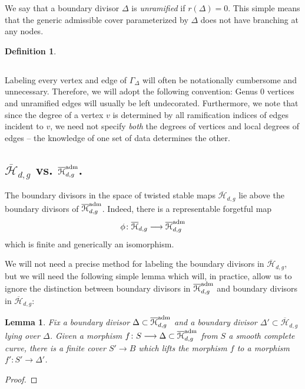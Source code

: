 \documentclass[reqno, 10 pt]{article}
\newtheorem{lem}[thm]{Lemma}
\theoremstyle{definition}
\newtheorem{defn}[thm]{Definition}
\theoremstyle{remark}
\numberwithin{equation}{section}
\numberwithin{thm}{section}
\numberwithin{prop}{section}
\numberwithin{lem}{section}
\numberwithin{cor}{section}
\numberwithin{conj}{section}
\numberwithin{defn}{section}
\renewcommand{\H}{\mathcal H}
\newcommand{\Hdg}{\overline{\H}_{d,g}}
\renewcommand{\to}{\longrightarrow}
\newcommand {\from}{{\colon}}
\renewcommand{\H}{{\mathcal{H}}}
\begin{document}
  We say that a boundary divisor $\Delta$ is {\sl unramified} if $r(\Delta)=0$.  This simple means that the generic admissible cover parameterized by $\Delta$ does not have branching at any nodes.

  \begin{defn}\label{excessdefn}

  \end{defn}


\subsection{}
  Labeling every vertex and edge of $\Gamma_{\Delta}$ will often be notationally cumbersome and unnecessary.  Therefore, we will adopt the following convention: Genus $0$ vertices and unramified edges will usually be left undecorated. Furthermore, we note that since the degree of a vertex $v$ is determined by all ramification indices of edges incident to $v$, we need not specify {\sl both} the degrees of vertices and local degrees of edges -- the knowledge of one set of data determines the other.

\subsection{$\Hdg$ vs. $\o{\H}^{\rm{adm}}_{d,g}$. } 
  The boundary divisors in the space of twisted stable maps  $\Hdg$ lie above the boundary divisors of  $\overline{\H}_{d,g}^{\rm{adm}}$.  Indeed, there is a representable forgetful map \[\phi \from \Hdg \to \o{\H}^{\rm{adm}}_{d,g}\] which is finite and generically an isomorphism.

  We will not need a precise method for labeling the boundary divisors in $\overline{\H}_{d,g}$, but we will need the following simple lemma which will, in practice, allow us to ignore the distinction between boundary divisors in $\overline{\H}_{d,g}^{\rm{adm}}$ and boundary divisors in $\Hdg$:

  \begin{lem}\label{liftingtotwisted}
  Fix a boundary divisor $\Delta \subset \Hdg^{\rm{adm}}$ and a boundary divisor $\Delta' \subset  \Hdg$ lying over $\Delta$. Given a morphism $f \from S \to \Delta \subset \Hdg^{\rm{adm}}$ from $S$ a smooth complete curve, there is a finite cover $S' \to B$ which lifts the morphism $f$ to a morphism $f' \from S' \to \Delta'$.  
  \end{lem}

  \begin{proof}

  \end{proof}
\end{document}
